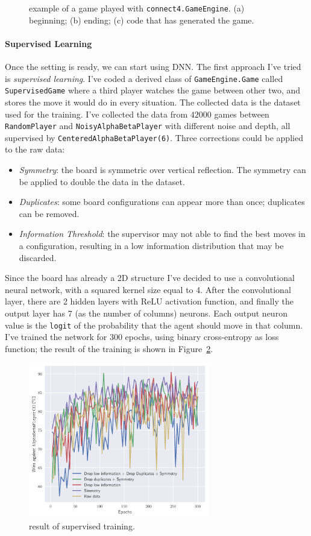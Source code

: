 \documentclass{article}
\newcommand{\ipy}[1]{\texttt{#1}}
\begin{document}
\begin{figure}
    \caption{example of a game played with \ipy{connect4.GameEngine}. (a) beginning; (b) ending; (c) code that has generated the game.}
    \label{fig:screenshot}
  \end{figure}

  \paragraph{Supervised Learning}
  Once the setting is ready, we can start using DNN. The first approach I've tried is \emph{supervised learning}. I've coded a
  derived class of \ipy{GameEngine.Game} called \ipy{SupervisedGame} where a third player watches the game between other two, and stores the move it would do in every situation. The collected data is the dataset used for the training. I've collected the data from \(42000\) games between \ipy{RandomPlayer} and \ipy{NoisyAlphaBetaPlayer} with different noise and depth, all supervised by \ipy{CenteredAlphaBetaPlayer(6)}. Three corrections could be applied to the raw data:
  \begin{itemize}
    \item \emph{Symmetry}: the board is symmetric over vertical reflection. The symmetry can be applied to double the data in the dataset.
    \item \emph{Duplicates}: some board configurations can appear more than once; duplicates can be removed.
    \item \emph{Information Threshold}: the supervisor may not able to find the best moves in a configuration, resulting in a low information distribution that may be discarded.
  \end{itemize}
  Since the board has already a 2D structure I've decided to use a convolutional neural network, with a squared kernel size equal to 4. After the convolutional layer, there are 2 hidden layers with ReLU activation function, and finally the output layer has 7 (as the number of columns) neurons. Each output neuron value is the \texttt{logit} of the probability that the agent should move in that column. 
  I've trained the network for 300 epochs, using binary cross-entropy as loss function; the result of the training is shown in Figure~\ref{fig:supervisedresult}.
  \begin{figure}
    \centering 
    \includegraphics[width=0.7\textwidth]{img/supervised.pdf}
    
    \caption{result of supervised training.}
    \label{fig:supervisedresult}
  \end{figure}
\end{document}
